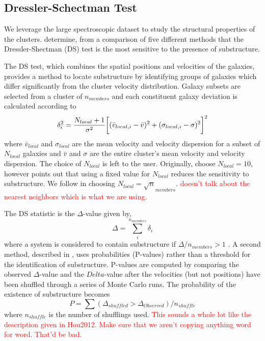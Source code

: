 \documentclass[apj, revtex4]{emulateapj}
\newcommand{\editorial}[1]{\textcolor{red}{#1}}
\begin{document}
\subsection{Dressler-Schectman Test}
We leverage the large spectroscopic dataset to study the structural properties of the clusters. \cite{Pinkney1996} determine, from a comparison of five different methods that the Dressler-Shectman (DS) test \citep{Dressler1988} is the most sensitive to the presence of substructure.

The DS test, which combines the spatial positions and velocities of the galaxies, provides a method to locate substructure by identifying groups of galaxies which differ significantly from the cluster velocity distribution. Galaxy subsets are selected from a cluster of $n_{members}$ and each constituent galaxy deviation is calculated according to
\begin{equation}
	\delta_i^2 = \frac{N_{local}+1}{\sigma^2}\bigg{[}(\bar{v}_{local,i} - \bar{v})^2 + (\sigma_{local,i} - \sigma)^2\bigg{]}^2
\end{equation}
where $\bar{v}_{local}$ and $\sigma_{local}$ are the mean velocity and velocity dispersion for a subset of $N_{local}$ galaxies and $\bar{v}$ and $\sigma$ are the entire cluster's mean velocity and velocity dispersion. The choice of $N_{local}$ is left to the user. Originally, \cite{Dressler1988} choose $N_{local}=10$, however \cite{Bird1994} points out that using a fixed value for $N_{local}$ reduces the sensitivity to substructure. We follow \cite{Bird1994} in choosing $N_{local} = \sqrt n_{members}$. \editorial{doesn't talk about the nearest neighbors which is what we are using.}

The DS statistic is the $\Delta$-value given by, 
\begin{equation}
	\Delta = \sum^{n_{members}}_i \delta_i
\end{equation}
where a system is considered to contain substructure if $\Delta/n_{members} > 1$ \citep{Dressler1988}. A second method, described in \cite{Hou2012}, uses probabilities (P-values) rather than a threshold for the identification of substructure. P-values are computed by comparing the observed $\Delta$-value and the $Delta$-value after the velocities (but not positions) have been shuffled through a series of Monte Carlo runs. The probability of the existence of substructure becomes
\begin{equation}
	P = \sum (\Delta_{shuffled} > \Delta_{Observed}) / n_{shuffle}
\end{equation}
where $n_{shuffle}$ is the number of shufflings used. \editorial{This sounds a whole lot like the description given in Hou2012. Make sure that we aren't copying anything word for word. That'd be bad.}
\end{document}
